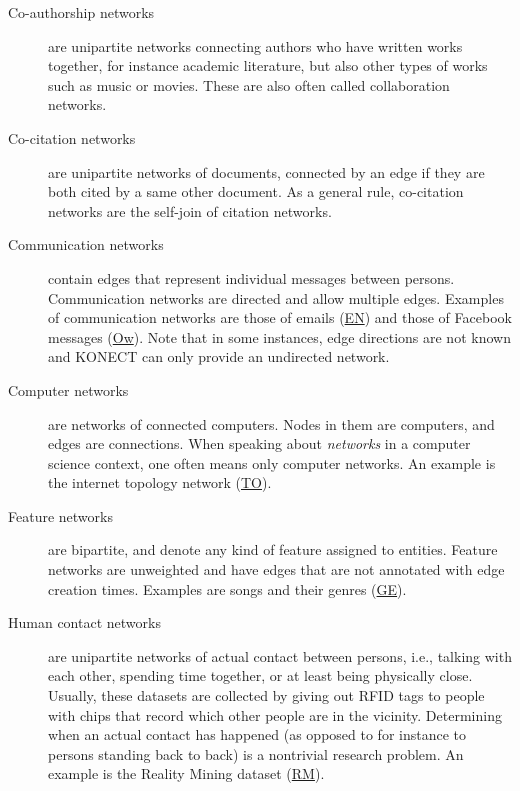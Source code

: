 \documentclass{article}
\begin{document}
\begin{description}
\item[Co-authorship networks] are unipartite networks connecting authors
  who have written works together, for instance academic literature, but
  also other types of works such as music or movies.  These are also
  often called collaboration networks.  

\item[Co-citation networks] are unipartite networks of documents,
  connected by an edge if they are both cited by a same other document.
  As a general rule, co-citation networks are the self-join of citation
  networks. 
  
\item[Communication networks] contain edges that represent
  individual messages between persons.  Communication networks are directed
  and allow multiple edges.  
  Examples of communication networks are those of
  emails (\href{http://konect.cc/networks/enron/}{\textsf{EN}})
  and those of
  Facebook messages
  (\href{http://konect.cc/networks/facebook-wosn-wall/}{\textsf{Ow}}). Note
  that in some instances, edge directions are not 
  known and KONECT can only provide an undirected network. 

\item[Computer networks] are networks of connected computers. 
  Nodes in them are computers, and edges are connections. 
  When speaking about \emph{networks} in a computer science context, one
  often means only computer networks.  An example is the internet
  topology network (\href{http://konect.cc/networks/topology/}{\textsf{TO}}).

\item[Feature networks] are bipartite, and denote any kind of feature
  assigned to entities. Feature networks are unweighted and have
  edges that are not annotated with edge creation times.  Examples are
  songs and their genres
  (\href{http://konect.cc/networks/dbpedia-genre/}{\textsf{GE}}).   

\item[Human contact networks] are unipartite networks of actual contact
  between persons, i.e., talking with each other, spending time
  together, or at least being physically close.  Usually, these datasets
  are collected by giving out RFID tags to people with chips that record
  which other people are in the vicinity.  Determining when an actual
  contact has happened (as opposed to for instance to persons standing
  back to back) is a nontrivial research problem. 
  An example is the Reality Mining dataset
  (\href{http://konect.cc/networks/mit/}{\textsf{RM}}). 


\end{description}
\end{document}
